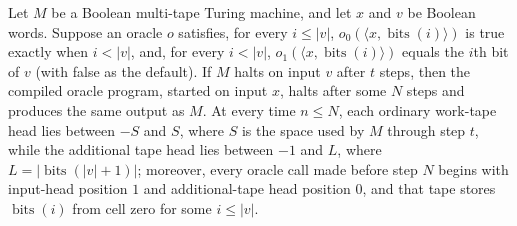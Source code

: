 \begin{theorem}
\label{Complexity.LogProg.OIS.run}
\leanok
{}
Let $M$ be a Boolean multi-tape Turing machine, and let $x$ and $v$ be Boolean words.
Suppose an oracle $o$ satisfies, for every $i\le |v|$, $o_0(\langle
x,\operatorname{bits}(i)\rangle)$ is true exactly when $i<|v|$, and, for every $i<|v|$,
$o_1(\langle x,\operatorname{bits}(i)\rangle)$ equals the $i$th bit of $v$ (with false
as the default). If $M$ halts on input $v$ after $t$ steps, then the compiled oracle
program, started on input $x$, halts after some $N$ steps and produces the same output
as $M$. At every time $n\le N$, each ordinary work-tape head lies between $-S$ and $S$,
where $S$ is the space used by $M$ through step $t$, while the additional tape head lies
between $-1$ and $L$, where $L=|\operatorname{bits}(|v|+1)|$; moreover, every oracle
call made before step $N$ begins with input-head position $1$ and additional-tape head
position $0$, and that tape stores $\operatorname{bits}(i)$ from cell zero for some
$i\le |v|$.
\end{theorem}

